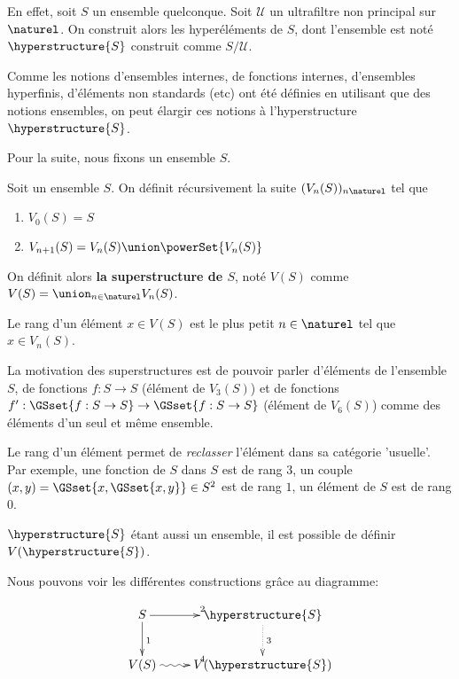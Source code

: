 \documentclass[a4paper, 12pt]{report}
\begin{document}
En effet, soit $S$ un ensemble quelconque. Soit $\mathcal{U}$ un ultrafiltre non
principal sur $\naturel$. On construit alors les hyperéléments de $S$, dont
l'ensemble est noté $\hyperstructure{S}$ construit comme
$S/\mathcal{U}$.

Comme les notions d'ensembles internes, de fonctions internes, d'ensembles
hyperfinis, d'éléments non standards (etc) ont été définies en utilisant que des
notions ensembles, on peut élargir ces notions à l'hyperstructure
$\hyperstructure{S}$.

Pour la suite, nous fixons un ensemble $S$.


\begin{definition}
	Soit un ensemble $S$. On définit récursivement la suite $(V_{n}(S))_{n
	\naturel}$ tel que
	\begin{enumerate}
		\item $V_{0}(S) = S$
		\item $V_{n + 1}(S) = V_{n}(S) \union \powerSet{V_{n}(S)}$
	\end{enumerate}

	On définit alors \textbf{la superstructure de $S$}, noté $V(S)$ comme $V(S)
	= \union_{n \in \naturel}V_{n}(S)$.

	Le rang d'un élément $x \in V(S)$ est le plus petit $n \in \naturel$ tel que
	$x \in V_{n}(S)$.
\end{definition}

La motivation des superstructures est de pouvoir parler d'éléments de l'ensemble
$S$, de fonctions $f : S \rightarrow S$ (élément de $V_{3}(S)$) et de fonctions
$f' : \GSset{f : S \rightarrow S} \rightarrow \GSset{f : S \rightarrow S}$
(élément de $V_{6}(S)$) comme des éléments d'un seul et même ensemble.

Le rang d'un élément permet de \textit{reclasser} l'élément dans sa catégorie
'usuelle'. Par exemple, une fonction de $S$ dans $S$ est de rang $3$, un couple
$(x, y) = \GSset{x, \GSset{x, y} } \in S^{2}$ est de rang $1$, un élément de $S$
est de rang $0$.

$\hyperstructure{S}$ étant aussi un ensemble, il est possible de définir
$V(\hyperstructure{S})$.

Nous pouvons voir les différentes constructions grâce au diagramme:

\begin{displaymath}
	\xymatrix{ 	S \ar[d]^{1} \ar[r]^{2} & \hyperstructure{S} \ar@{.>}[d]^{3} \\
	V(S) \ar@{~>}[r]^{4} & V(\hyperstructure{S})}
\end{displaymath}
\end{document}
